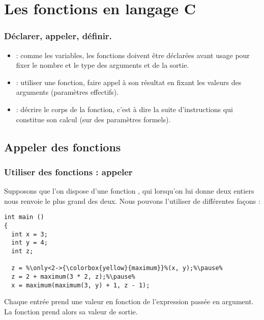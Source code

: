 \documentclass[xcolor=pdftex,svgnames,table]{beamer}
\begin{document}
\section[En C]{Les fonctions en langage C}
\begin{frame}
\frametitle{Déclarer, appeler, définir.}
\pause
\begin{itemize}
\item {} : comme les variables, les fonctions
  doivent être déclarées avant usage pour fixer \alert{le nombre} et le type
  des arguments et de la sortie.\pause
\item {} : utiliser une fonction, faire appel à son
  résultat en fixant les valeurs des arguments (paramètres effectifs).\pause
\item {} : décrire le corps de la fonction, c'est à
  dire la suite d'instructions qui constitue son calcul (sur des
  paramètres formels).
\end{itemize}
\end{frame}

\subsection{Appeler des fonctions}
\begin{frame}[fragile]
  \frametitle{Utiliser des fonctions : appeler}

Supposons que l'on dispose d'une fonction , qui lorsqu'on
lui donne deux entiers nous renvoie le plus grand des deux. 
\pause
Nous pouvons l'utiliser de différentes façons :
\begin{lstlisting}[escapechar={\%},basicstyle=\ttfamily\small] 
int main ()
{
  int x = 3;
  int y = 4;
  int z;

  z = %\only<2->{\colorbox{yellow}{maximum}}%(x, y);%\pause%
  z = 2 + maximum(3 * 2, z);%\pause%
  x = maximum(maximum(3, y) + 1, z - 1);
\end{lstlisting}
\pause
Chaque entrée prend une valeur en fonction de l'expression passée en
argument. La fonction prend alors sa valeur de sortie.
\end{frame}
\end{document}
